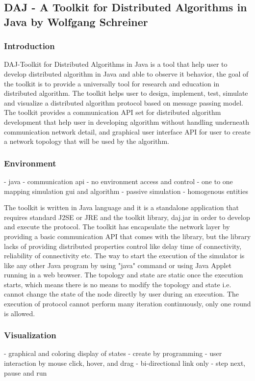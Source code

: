 \subsection{DAJ - A Toolkit for Distributed Algorithms in Java by Wolfgang Schreiner}

\subsubsection{Introduction}
DAJ-Toolkit for Distributed Algorithms in Java is a tool that help user to develop distributed algorithm in Java and able to observe it behavior, the goal of the toolkit is to provide a universally tool for research and education in distributed algorithm. The toolkit helps user to design, implement, test, simulate and visualize a distributed algorithm protocol based on message passing model. The toolkit provides a communication API set for distributed algorithm development that help user in developing algorithm without handling underneath communication network detail, and graphical user interface API for user to create a network topology that will be used by the algorithm.

\subsubsection{Environment}
- java
- communication api
- no environment access and control
- one to one mapping simulation gui and algorithm
- passive simulation
- homogenous entities

The toolkit is written in Java language and it is a standalone application that requires standard J2SE or JRE and the toolkit library, daj.jar in order to develop and execute the protocol. The toolkit has encapsulate the network layer by providing a basic communication API that comes with the library, but the library lacks of providing distributed properties control like delay time of connectivity, reliability of connectivity etc. The way to start the execution of the simulator is like any other Java program by using "java" command or using Java Applet running in a web browser. The topology and state are static once the execution starts, which means there is no means to modify the topology and state i.e. cannot change the state of the node directly by user during an execution. The execution of protocol cannot perform many iteration continuously, only one round is allowed.

\subsubsection{Visualization}
- graphical and coloring display of states
- create by programming
- user interaction by mouse click, hover, and drag
- bi-directional link only
- step next, pause and run

